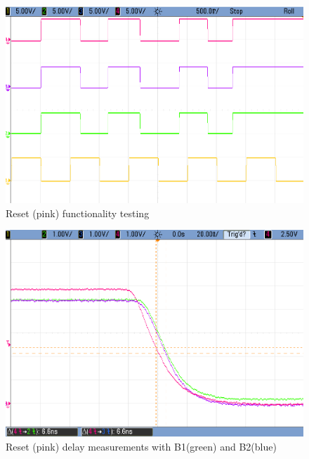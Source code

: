 \begin{figure}[H]
    \begin{center}
        \includegraphics[scale=0.3]{../Exercise1/Moore/report/images/e3e1_1_4nreset.png}
        \caption{Reset (pink) functionality testing}
        \label{fig:moore_nres}
    \end{center}
\end{figure}

\begin{figure}[H]
    \begin{center}
        \includegraphics[scale=0.3]{../Exercise1/Moore/report/images/e3e1_nreset_delay.png}
        \caption{Reset (pink) delay measurements with B1(green) and B2(blue)}
        \label{fig:moore_nres_delay}
    \end{center}
\end{figure}

